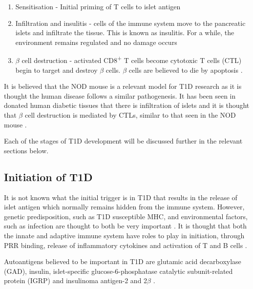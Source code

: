 \begin{enumerate}
\item Sensitisation - Initial priming of T cells to islet antigen
\item Infiltration and insulitis - cells of the immune system move to the pancreatic islets and infiltrate the tissue. This is known as insulitis. For a while, the environment remains regulated and no damage occurs
\item $\beta$ cell destruction - activated CD8\textsuperscript{+} T cells become cytotoxic T cells (CTL) begin to target and destroy $\beta$ cells. $\beta$ cells are believed to die by apoptosis \citep{Cnop2005}.
\end{enumerate}

It is believed that the NOD mouse is a relevant model for T1D research as it is thought the human disease follows a similar pathogenesis.
It has been seen in donated human diabetic tissues that there is infiltration of islets and it is thought that $\beta$ cell destruction is mediated by CTLs, similar to that seen in the NOD mouse \citep{Hanafusa2008}.

Each of the stages of T1D development will be discussed further in the relevant sections below.


\subsection{Initiation of T1D}



It is not known what the initial trigger is in T1D that results in the release of islet antigen which normally remains hidden from the immune system.
However, genetic predisposition, such as T1D susceptible MHC, and environmental factors, such as infection \citep{Filippi2008} are thought to both be very important \citep{Knip2005}.
It is thought that both the innate and adaptive immune system have roles to play in initiation, through PRR binding, release of inflammatory cytokines and activation of T and B cells \citep{Diana2011}.

Autoantigens believed to be important in T1D are glutamic acid decarboxylase (GAD), insulin, islet-specific glucose-6-phosphatase catalytic subunit-related protein (IGRP) and insulinoma antigen-2 and 2$\beta$ \citep{Green1999, Roep2012}.


